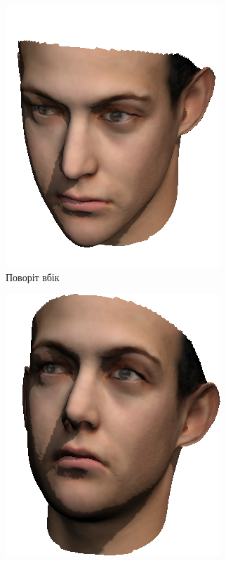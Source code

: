 \begin{figure}[h]
\begin{subfigure}[b]{0.3\textwidth}
    \includegraphics[width=\textwidth]{images/face_rotated_2}
    \caption{Поворіт вбік}
  \end{subfigure}
  \begin{subfigure}[b]{0.3\textwidth}
    \centering
    \includegraphics[width=\textwidth]{images/face_rotated_3}

\end{subfigure}
\end{figure}
